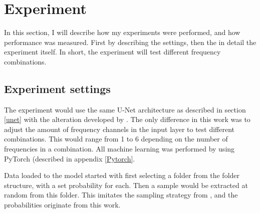 \section{Experiment} \label{Experiment}
    In this section, I will describe how my experiments were performed, and how performance was measured. First by describing the settings, then the in detail the experiment itself. In short, the experiment will  test different frequency combinations.
    
    \subsection{Experiment settings} \label{Experiment settings}
        The experiment would use the same U-Net architecture as described in section \ref{unet} with the alteration developed by \citeauthor{brautaset2020acoustic}\cite{brautaset2020acoustic}. The only difference in this work was to adjust the amount of frequency channels in the input layer to test different combinations. This would range from 1 to 6 depending on the number of frequencies in a combination. All machine learning was performed by using PyTorch (described in appendix \ref{Pytorch}.
        
        Data loaded to the model started with first selecting a folder from the folder structure, with a set probability for each. Then a sample would be extracted at random from this folder. This imitates the sampling strategy from \citeauthor{brautaset2020acoustic}\cite{brautaset2020acoustic}, and the probabilities originate from this work.
        
